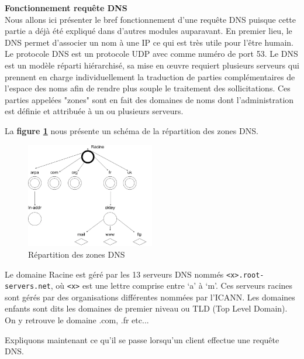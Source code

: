  \textbf{Fonctionnement requête DNS}\\

Nous allons ici présenter le bref fonctionnement d'une requête DNS puisque cette partie a déjà été expliqué dans d'autres modules auparavant. En premier lieu, le DNS permet d'associer un nom à une IP ce qui est très utile pour l'être humain.\\

 Le protocole DNS est un protocole UDP avec comme numéro de port 53. Le DNS est un modèle réparti hiérarchisé, sa mise en œuvre requiert plusieurs serveurs qui prennent en charge individuellement la traduction de parties complémentaires de l’espace des noms afin de rendre plus souple le traitement des sollicitations. Ces parties appelées "zones" sont en fait des domaines de noms dont l’administration est définie et attribuée à un ou plusieurs serveurs.

 La \textbf{figure \ref{fig:repartitiondns}} nous présente un schéma de la répartition des zones DNS.

\begin{figure}[htp!]
  \centering
  \setlength\figureheight{7cm}
  \setlength\figurewidth{9cm}
  \includegraphics[width=0.5\textwidth]{oui/images/Nslookup/dns.png}
  \caption{Répartition des zones DNS}
  \label{fig:repartitiondns}
\end{figure}

 Le domaine Racine est géré par les 13 serveurs DNS nommés \lstinline{<x>.root-servers.net}, où \lstinline{<x>} est une lettre comprise entre ‘a’ à ‘m’. Ces serveurs racines sont gérés par des organisations différentes nommées par l’ICANN. Les domaines enfants sont dits les domaines de premier niveau ou TLD (Top Level Domain). On y retrouve le domaine .com, .fr etc...\\

\newpage

Expliquons maintenant ce qu'il se passe lorsqu'un client effectue une requête DNS.

